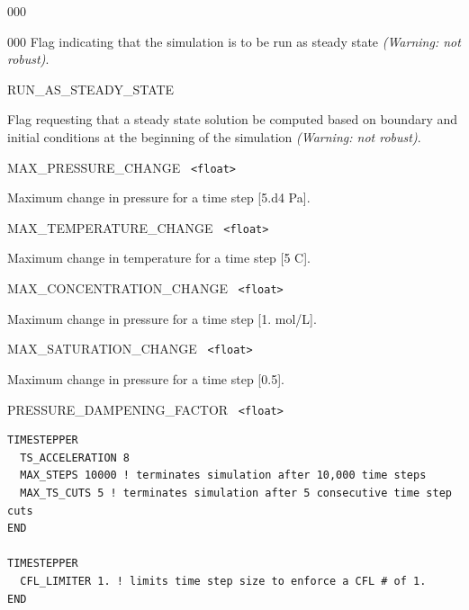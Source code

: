 \begin{deflist}{000}
\begin{deflist}{000}
Flag indicating that the simulation is to be run as steady state {\em (Warning: not robust)}.

\item[RUN\_AS\_STEADY\_STATE] ~

Flag requesting that a steady state solution be computed based on boundary and initial conditions at the beginning of the simulation {\em (Warning: not robust)}.

\item[MAX\_PRESSURE\_CHANGE] \ {\tt <float>} 

Maximum change in pressure for a time step [5.d4 Pa].

\item[MAX\_TEMPERATURE\_CHANGE] \ {\tt <float>} 

Maximum change in temperature for a time step [5 C].

\item[MAX\_CONCENTRATION\_CHANGE] \ {\tt <float>} 

Maximum change in pressure for a time step [1. mol/L].

\item[MAX\_SATURATION\_CHANGE] \ {\tt <float>} 

Maximum change in pressure for a time step [0.5].

\item[PRESSURE\_DAMPENING\_FACTOR] \ {\tt <float>}
\end{deflist}
\item[\keyend]
\end{deflist}


\newpage
{}

\begin{mdframed}
\footnotesize
\begin{Verbatim}
TIMESTEPPER
  TS_ACCELERATION 8
  MAX_STEPS 10000 ! terminates simulation after 10,000 time steps
  MAX_TS_CUTS 5 ! terminates simulation after 5 consecutive time step cuts
END

TIMESTEPPER
  CFL_LIMITER 1. ! limits time step size to enforce a CFL # of 1.
END
\end{Verbatim}
\normalsize
\end{mdframed}

